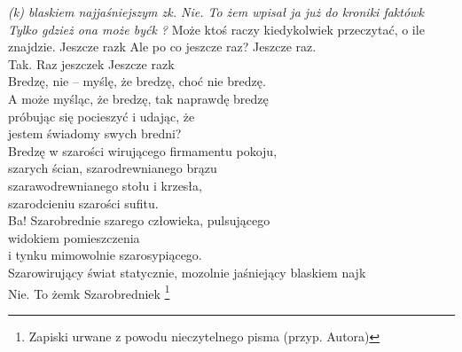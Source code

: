 \documentclass[../MAIN.tex]{subfiles}
\begin{document}
\setlength{\vgap}{1ex}
{\it{(\3k) blaskiem najjaśniejszym z\3k. Nie. To żem wpisał ja już do kroniki faktów\3k Tylko gdzież ona może być\3k ?}}
\settowidth{\versewidth}{A może myśląc, że bredzę}
\spi
{M}{oże ktoś raczy kiedykolwiek przeczytać, o ile znajdzie.
Jeszcze raz\3k Ale po co jeszcze raz? Jeszcze raz.\\
Tak. Raz jeszcze\3k Jeszcze raz\3k\\
Bredzę, nie -- myślę, że bredzę, choć nie bredzę.\\
A może myśląc, że bredzę, tak naprawdę bredzę\\
próbując się pocieszyć i udając, że\\
jestem świadomy swych bredni?\\
Bredzę w szarości wirującego firmamentu pokoju,\\
szarych ścian, szarodrewnianego brązu\\
szarawodrewnianego stołu i krzesła,\\
szarodcieniu szarości sufitu.\\
Ba! Szarobrednie szarego człowieka, pulsującego\\
widokiem pomieszczenia\\
i tynku mimowolnie szarosypiącego.\\
Szarowirujący świat statycznie, mozolnie jaśniejący blaskiem naj\3k \\
Nie. To żem\3k Szarobrednie\3k
\footnote{Zapiski urwane z powodu nieczytelnego pisma (przyp. Autora)}}
\qpi
% 
\spi
\end{document}
